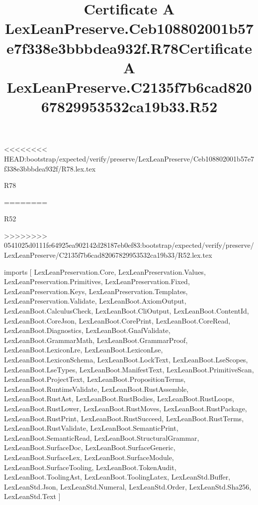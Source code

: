 <<<<<<<< HEAD:bootstrap/expected/verify/preserve/LexLeanPreserve/Ceb108802001b57e7f338e3bbbdea932f/R78.lex.tex
\begin{lexlean}{R78}
\title{Certificate A LexLeanPreserve.Ceb108802001b57e7f338e3bbbdea932f.R78}
========
\begin{lexlean}{R52}
\title{Certificate A LexLeanPreserve.C2135f7b6cad82067829953532ca19b33.R52}
>>>>>>>> 0541025d0111fe64925ea902142d28187eb0ef83:bootstrap/expected/verify/preserve/LexLeanPreserve/C2135f7b6cad82067829953532ca19b33/R52.lex.tex
\begin{coremodule}
imports [
  LexLeanPreservation.Core,
  LexLeanPreservation.Values,
  LexLeanPreservation.Primitives,
  LexLeanPreservation.Fixed,
  LexLeanPreservation.Keys,
  LexLeanPreservation.Templates,
  LexLeanPreservation.Validate,
  LexLeanBoot.AxiomOutput,
  LexLeanBoot.CalculusCheck,
  LexLeanBoot.CliOutput,
  LexLeanBoot.ContentId,
  LexLeanBoot.CoreJson,
  LexLeanBoot.CorePrint,
  LexLeanBoot.CoreRead,
  LexLeanBoot.Diagnostics,
  LexLeanBoot.GnafValidate,
  LexLeanBoot.GrammarMath,
  LexLeanBoot.GrammarProof,
  LexLeanBoot.LexiconLre,
  LexLeanBoot.LexiconLse,
  LexLeanBoot.LexiconSchema,
  LexLeanBoot.LockText,
  LexLeanBoot.LseScopes,
  LexLeanBoot.LseTypes,
  LexLeanBoot.ManifestText,
  LexLeanBoot.PrimitiveScan,
  LexLeanBoot.ProjectText,
  LexLeanBoot.PropositionTerms,
  LexLeanBoot.RuntimeValidate,
  LexLeanBoot.RustAssemble,
  LexLeanBoot.RustAst,
  LexLeanBoot.RustBodies,
  LexLeanBoot.RustLoops,
  LexLeanBoot.RustLower,
  LexLeanBoot.RustMoves,
  LexLeanBoot.RustPackage,
  LexLeanBoot.RustPrint,
  LexLeanBoot.RustSucceed,
  LexLeanBoot.RustTerms,
  LexLeanBoot.RustValidate,
  LexLeanBoot.SemanticPrint,
  LexLeanBoot.SemanticRead,
  LexLeanBoot.StructuralGrammar,
  LexLeanBoot.SurfaceDoc,
  LexLeanBoot.SurfaceGeneric,
  LexLeanBoot.SurfaceLex,
  LexLeanBoot.SurfaceModule,
  LexLeanBoot.SurfaceTooling,
  LexLeanBoot.TokenAudit,
  LexLeanBoot.ToolingAst,
  LexLeanBoot.ToolingLatex,
  LexLeanStd.Buffer,
  LexLeanStd.Json,
  LexLeanStd.Numeral,
  LexLeanStd.Order,
  LexLeanStd.Sha256,
  LexLeanStd.Text
]


\end{coremodule}
\end{lexlean}
\end{lexlean}
